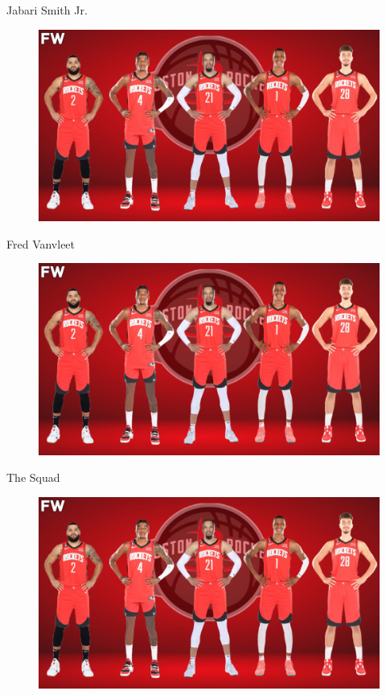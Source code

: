 \begin{frame}{Jabari Smith Jr.}
    \begin{figure}[h]
        \includegraphics[width=0.8\linewidth]{images/team.png}
        \label{fig:Team}
    \end{figure}
\end{frame}
\begin{frame}{Fred Vanvleet}
    \begin{figure}[h]
        \includegraphics[width=0.8\linewidth]{images/team.png}
        \label{fig:Team}
    \end{figure}
\end{frame}

\begin{frame}{The Squad}
    \begin{figure}[h]
        \includegraphics[width=0.8\linewidth]{images/team.png}
        \label{fig:Team}
    \end{figure}
\end{frame}



\thanksframe
